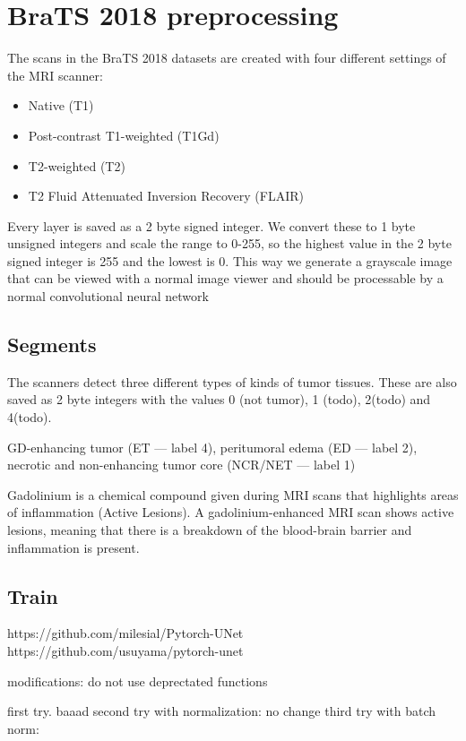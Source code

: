 \chapter{BraTS 2018 preprocessing}
The scans in the BraTS 2018 datasets are created with four different settings of the MRI scanner:

\begin{itemize}
    \item Native (T1)
    \item Post-contrast T1-weighted (T1Gd)
    \item T2-weighted (T2)
    \item T2 Fluid Attenuated Inversion Recovery (FLAIR)
\end{itemize}

Every layer is saved as a 2 byte signed integer. We convert these to 1 byte unsigned integers and scale the range to 0-255, so the highest value in the 2 byte signed integer is 255 and the lowest is 0.
This way we generate a grayscale image that can be viewed with a normal image viewer and should be processable by a normal convolutional neural network

\section{Segments}
The scanners detect three different types of kinds of tumor tissues. These are also saved as 2 byte integers with the values 0 (not tumor), 1 (todo), 2(todo) and 4(todo).


GD-enhancing tumor (ET — label 4),
peritumoral edema (ED — label 2),
necrotic and non-enhancing tumor core (NCR/NET — label 1)



Gadolinium is a chemical compound given during MRI scans that highlights areas of inflammation (Active Lesions). A gadolinium-enhanced  MRI scan shows active lesions, meaning that there is a breakdown of the blood-brain barrier and inflammation is present.


\section{Train}
https://github.com/milesial/Pytorch-UNet
https://github.com/usuyama/pytorch-unet

modifications: do not use deprectated functions

first try. baaad
second try with normalization: no change
third try with batch norm: